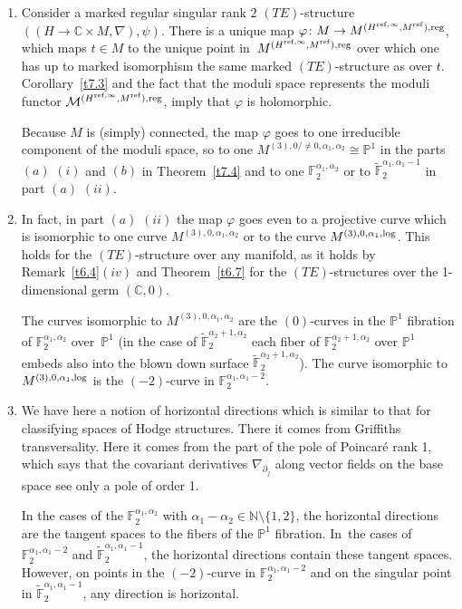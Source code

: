 \documentclass[10pt,a4paper]{amsart}
\numberwithin{equation}{section}
\numberwithin{figure}{section}
\newcommand{\N}{{\mathbb N}}
\newcommand{\C}{{\mathbb C}}
\renewcommand{\P}{{\mathbb P}}
\newcommand{\F}{{\mathbb F}}
\newcommand{\MM}{{\mathcal M}}
\newcommand{\www}{\widetilde}
\newcommand{\paa}{\partial}
\newcommand{\nnn}{\nabla}
\begin{document}
\begin{Remarks}\label{t7.5}\quad

\begin{enumerate}\itemsep=-1pt
\item[$(i)$] Consider a marked regular singular rank $2$ $(TE)$-structure
$((H\to\C\times M,\nnn),\psi)$. There is a unique
map $\varphi\colon M\to M^{(H^{{\rm ref},\infty},M^{\rm ref}),{\rm reg}}$,
which maps $t\in M$ to the unique point in~$M^{(H^{{\rm ref},\infty},M^{\rm ref}),{\rm reg}}$ over which one has up to
marked isomorphism the same marked $(TE)$-structure
as over $t$. Corollary~\ref{t7.3} and the fact that the
moduli space represents the moduli functor
$\MM^{(H^{{\rm ref},\infty},M^{\rm ref}),{\rm reg}}$, imply that
$\varphi$ is holomorphic.

Because $M$ is (simply) connected, the map $\varphi$ goes to
one irreducible component of the moduli space,
so to one $M^{(3),0/\neq 0,\alpha_1,\alpha_2}\cong\P^1$
in the parts $(a)$ $(i)$ and $(b)$ in Theorem~\ref{t7.4}
and to one $\F_2^{\alpha_1,\alpha_2}$ or to
$\www\F_2^{\alpha_1,\alpha_1-1}$ in part $(a)$ $(ii)$.

\item[$(ii)$] In fact, in part $(a)$ $(ii)$ the map $\varphi$ goes even
to a projective curve which is isomorphic to one curve
$M^{(3),0,\alpha_1,\alpha_2}$ or to the curve
$M^{(3),0,\alpha_1,{\rm log}}$.
This holds for the $(TE)$-structure over any manifold,
as it holds by Remark~\ref{t6.4}$(iv)$ and Theorem~\ref{t6.7} for the $(TE)$-structures over the
1-dimensional germ $(\C,0)$.

The curves isomorphic to $M^{(3),0,\alpha_1,\alpha_2}$
are the $(0)$-curves in the $\P^1$ fibration of
$\F_2^{\alpha_1,\alpha_2}$ over~$\P^1$ \big(in the case of
$\www\F_2^{\alpha_2+1,\alpha_2}$ each fiber of
$\F_2^{\alpha_2+1,\alpha_2}$ over $\P^1$ embeds also into
the blown down surface $\www\F_2^{\alpha_2+1,\alpha_2}$\big).
The curve isomorphic to $M^{(3),0,\alpha_1,{\rm log}}$
is the $(-2)$-curve in $\F_2^{\alpha_1,\alpha_1-2}$.

\item[$(iii)$] We have here a notion of horizontal directions which
is similar to that for classifying spaces of
Hodge structures. There it comes from Griffiths
transversality. Here it comes from the part of the
pole of Poincar\'e rank 1, which says that the covariant
derivatives $\nnn_{\paa_j}$ along vector fields on the
base space see only a pole of order 1.

In the cases of the $\F_2^{\alpha_1,\alpha_2}$
with $\alpha_1-\alpha_2\in\N\setminus \{1,2\}$, the horizontal
directions are the tangent spaces to the fibers of the
$\P^1$ fibration. In~the cases of $\F_2^{\alpha_1,\alpha_1-2}$ and
$\www \F_2^{\alpha_1,\alpha_1-1}$, the horizontal directions
contain these tangent spaces.
However, on points in the $(-2)$-curve in
$\F_2^{\alpha_1,\alpha_1-2}$
and on the singular point in
$\www\F_2^{\alpha_1,\alpha_1-1}$,
any direction is horizontal.
\end{enumerate}
\end{Remarks}
\end{document}
